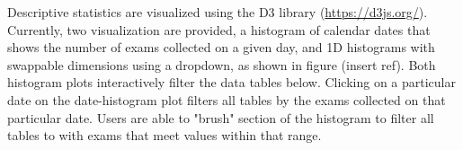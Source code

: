 Descriptive statistics are visualized using the D3 library (\href{https://d3js.org/}{https://d3js.org/}). Currently, two visualization are provided, a histogram of calendar dates that shows the number of exams collected on a given day, and 1D histograms with swappable dimensions using a dropdown, as shown in figure (insert ref). Both histogram plots interactively filter the data tables below. Clicking on a particular date on the date-histogram plot filters all tables by the exams collected on that particular date. Users are able to "brush" section of the histogram to filter all tables to with exams that meet values within that range.  